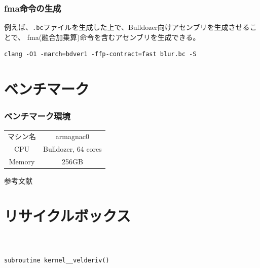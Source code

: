 \documentclass[dvipdfmx,cjk]{beamer}
\begin{document}
\begin{frame}[fragile]\frametitle{fma命令の生成}

例えば、{\tt .bc}ファイルを生成した上で、Bulldozer向けアセンブリを生成させることで、
fma(融合加乗算)命令を含むアセンブリを生成できる。
\begingroup
    \fontsize{8pt}{9pt}\selectfont
\begin{verbatim}
clang -O1 -march=bdver1 -ffp-contract=fast blur.bc -S
\end{verbatim}
\endgroup
\vspace{-1cm}


\end{frame}


\section{ベンチマーク}
\begin{frame}\frametitle{ベンチマーク環境}
\begin{center}
  \begin{tabular}{|c|c|}
    \hline
    マシン名 & armagnac0\\
    CPU & Bulldozer, 64 cores \\
    Memory & 256GB \\
    \hline
  \end{tabular}
\end{center}
\end{frame}


\begin{frame}[allowframebreaks]{参考文献}{}
  
  
\end{frame}



% 
% 
% 








\section*{リサイクルボックス}




\subsection{}
\begin{frame}\frametitle{}
\begin{eqnarray}
\end{eqnarray}
\end{frame}


\begin{frame}[fragile]\frametitle{}
\begingroup
    \fontsize{8pt}{9pt}\selectfont
\begin{verbatim}
subroutine kernel__velderiv()
\end{verbatim}
\endgroup
\vspace{-1cm}
\end{frame}
\end{document}
